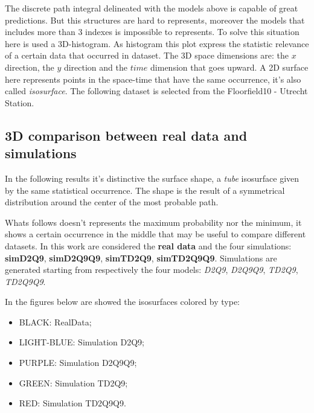 \documentclass[class=article, crop=false]{standalone}
\begin{document}
The discrete path integral delineated with the models above is capable of great predictions.
But this structures are hard to represents, moreover the models that includes more than 3 indexes is impossible to represents.
To solve this situation here is used a 3D-histogram.
As histogram this plot express the statistic relevance of a certain data that occurred in dataset.
The 3D space dimensions are: the $x$ direction, the $y$ direction and the $time$ dimension that goes upward.
A 2D surface here represents points in the space-time that have the same occurrence, it's also called \emph{isosurface}.
The following dataset is selected from the Floorfield10 - Utrecht Station.

\subsection{3D comparison between real data and simulations}
In the following results it's distinctive the surface shape, a \emph{tube} isosurface given by the same statistical occurrence.
The shape is the result of a symmetrical distribution around the center of the most probable path.

Whats follows doesn't represents the maximum probability nor the minimum, it shows a certain occurrence in the middle that may be useful to compare different datasets.
In this work are considered the \textbf{real data} and the four simulations: \textbf{simD2Q9}, \textbf{simD2Q9Q9}, \textbf{simTD2Q9}, \textbf{simTD2Q9Q9}.
Simulations are generated starting from respectively the four models: \emph{D2Q9}, \emph{D2Q9Q9}, \emph{TD2Q9}, \emph{TD2Q9Q9}.

In the figures below are showed the isosurfaces colored by type:
\begin{itemize}
\item BLACK: RealData;
\item LIGHT-BLUE: Simulation D2Q9;
\item PURPLE: Simulation D2Q9Q9;
\item GREEN: Simulation TD2Q9;
\item RED: Simulation TD2Q9Q9.
\end{itemize}

\FloatBarrier
\end{document}
